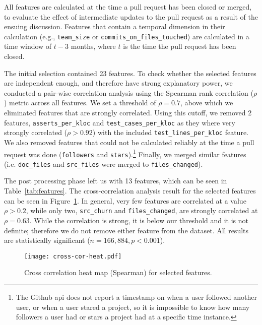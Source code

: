 \documentclass{sig-alternate}
\begin{document}
All features are calculated at the time a pull request has been closed or
merged, to evaluate the effect of intermediate updates to the pull request as a
result of the ensuing discussion. Features that contain a temporal dimension in
their calculation (e.g., \texttt{team\_size} or
\texttt{commits\_on\_files\_touched}) are calculated in a time window of $t - 3$
months, where $t$ is the time the pull request has been closed. 

The initial selection contained 23 features. To check whe\-ther the selected
features are independent enough, and therefore have strong explanatory power, we
conducted a pair-wise correlation analysis using the Spearman rank correlation
($\rho$) metric across all features. We set a threshold of $\rho = 0.7$, above
which we eliminated features that are strongly correlated. Using this cutoff, we
removed 2 features, \texttt{asserts\_per\_kloc} and
\texttt{test\_cases\_per\_kloc} as they where very strongly correlated ($\rho >
0.92$) with the included \texttt{test\_lines\_per\_kloc} feature. We also
removed features that could not be calculated reliably at the time a pull
request was done (\texttt{followers} and \texttt{stars}).\footnote{The Github
{\sc api} does not report a timestamp on when a user followed another user, or
when a user stared a project, so it is impossible to know how many followers a
user had or stars a project had at a specific time instance.} Finally, we
merged similar features (i.e. \texttt{doc\_files} and \texttt{src\_files} were merged to \texttt{files\_changed}). 

The post processing phase left us with 13 features, which can be seen in
Table~\ref{tab:features}. The cross-correlation analysis result for the
selected features can be seen in Figure~\ref{fig:crosscor}. In general, very few
features are correlated at a value $\rho > 0.2$, while only two,
\texttt{src\_churn} and \texttt{files\_changed}, are strongly correlated at
$\rho = 0.63$. While the correlation is strong, it is below our threshold and it
is not definite; therefore we do not remove either feature from the dataset. All
results are statistically significant ($n = 166,884, p < 0.001$).



\begin{figure}
  \begin{center}
    \texttt{[image: cross-cor-heat.pdf]}
  \end{center}
  \caption{Cross correlation heat map (Spearman) for selected features.}
  \label{fig:crosscor}
\end{figure}
\end{document}

